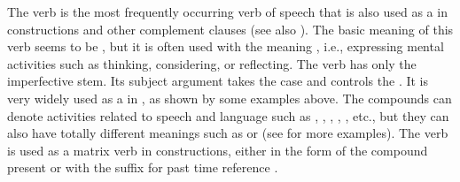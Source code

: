 The verb  is the most frequently occurring verb of speech that is also used as a   in  constructions and other complement clauses (see also ). The basic meaning of this verb seems to be , but it is often used with the meaning , i.e., expressing mental activities such as thinking, considering, or reflecting. The verb has only the imperfective stem. Its subject argument takes the  case and controls the  . It is very widely used as a  in , as shown by some examples above. The compounds can denote activities related to speech and language such as  ,  ,  ,  ,  , etc., but they can also have totally different meanings such as   or   (see  for more examples). The verb is used as a matrix verb in  constructions, either in the form of the compound present  or with the suffix  for past time reference .
%
